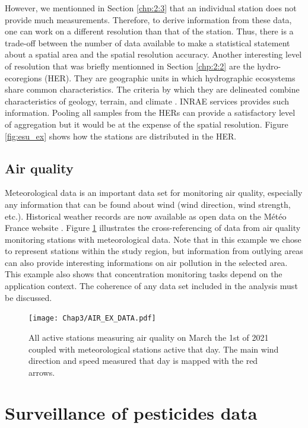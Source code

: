 However, we mentionned in Section \ref{chp:2:3} that an individual station does not provide much measurements. Therefore, to derive information from these data, one can work on a different resolution than that of the station.  Thus, there is a trade-off between the number of data available to make a statistical statement about a spatial area and the spatial resolution accuracy. Another interesting level of resolution that was briefly mentionned in Section \ref{chp:2:2} are the hydro-ecoregions (HER). They are geographic units in which hydrographic ecosystems share common characteristics. The criteria by which they are delineated combine characteristics of geology, terrain, and climate \cite{wasson:hal-02580774}. INRAE services provides such information. Pooling all samples from the HERs can provide a satisfactory level of aggregation but it would be at the expense of the spatial resolution. Figure \ref{fig:esu_ex} shows how the stations are distributed in the HER.  

\subsection{Air quality}

Meteorological data is an important data set for monitoring air quality, especially any information that can be found about wind (wind direction, wind strength, etc.). Historical weather records are now available as open data on the Météo France website \cite{SYNOP}. Figure \ref{fig:air_ex} illustrates the cross-referencing of data from air quality monitoring stations with meteorological data. Note that in this example we chose to represent stations within the study region, but information from outlying areas can also provide interesting informations on air pollution in the selected area. This example also shows that concentration monitoring tasks depend on the application context. The coherence of any data set included in the analysis must be discussed.   

\begin{figure}[ht]
    \centering
    \texttt{[image: Chap3/AIR\_EX\_DATA.pdf]}
    \caption{All active stations measuring air quality on March the 1st of 2021 coupled with meteorological stations active that day. The main wind direction and speed measured that day is mapped with the red arrows.}
    \label{fig:air_ex}
\end{figure}

\section{Surveillance of pesticides data}\label{chp:2:5}

